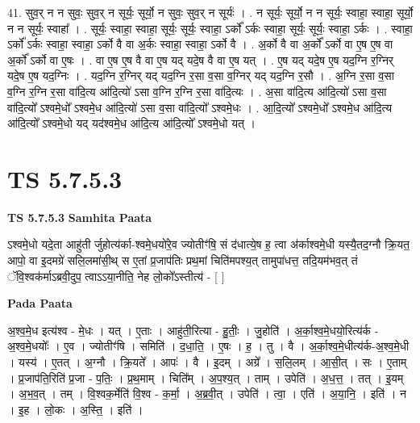 \documentclass[17pt]{extarticle}
\begin{document}
41. सुव॒र् न न सुवः॒ सुव॒र् न सूर्यः॒ सूर्यो॒ न सुवः॒ सुव॒र् न सूर्यः॑ । . न सूर्यः॒ सूर्यो॒ न न सूर्यः॒ स्वाहा॒ स्वाहा॒ सूर्यो॒ न न सूर्यः॒ स्वाहा᳚ । . सूर्यः॒ स्वाहा॒ स्वाहा॒ सूर्यः॒ सूर्यः॒ स्वाहा॒ ऽर्को᳚ ऽर्कः स्वाहा॒ सूर्यः॒ सूर्यः॒ स्वाहा॒ ऽर्कः । . स्वाहा॒ ऽर्को᳚ ऽर्कः स्वाहा॒ स्वाहा॒ ऽर्को वै वा अ॒र्कः स्वाहा॒ स्वाहा॒ ऽर्को वै । . अ॒र्को वै वा अ॒र्को᳚ ऽर्को वा ए॒ष ए॒ष वा अ॒र्को᳚ ऽर्को वा ए॒षः । . वा ए॒ष ए॒ष वै वा ए॒ष यद् यदे॒ष वै वा ए॒ष यत् । . ए॒ष यद् यदे॒ष ए॒ष यद॒ग्नि र॒ग्निर् यदे॒ष ए॒ष यद॒ग्निः । . यद॒ग्नि र॒ग्निर् यद् यद॒ग्नि र॒सा व॒सा व॒ग्निर् यद् यद॒ग्नि र॒सौ । . अ॒ग्नि र॒सा व॒सा व॒ग्नि र॒ग्नि र॒सा वा॑दि॒त्य आ॑दि॒त्यो॑ ऽसा व॒ग्नि र॒ग्नि र॒सा वा॑दि॒त्यः । . अ॒सा वा॑दि॒त्य आ॑दि॒त्यो॑ ऽसा व॒सा वा॑दि॒त्यो᳚ ऽश्वमे॒धो᳚ ऽश्वमे॒ध आ॑दि॒त्यो॑ ऽसा व॒सा वा॑दि॒त्यो᳚ ऽश्वमे॒धः । . आ॒दि॒त्यो᳚ ऽश्वमे॒धो᳚ ऽश्वमे॒ध आ॑दि॒त्य आ॑दि॒त्यो᳚ ऽश्वमे॒धो यद् यद॑श्वमे॒ध आ॑दि॒त्य आ॑दि॒त्यो᳚ ऽश्वमे॒धो यत् । \newline
\pagebreak
{}

\section{ TS 5.7.5.3 }

\textbf{TS 5.7.5.3 } \newline
\textbf{Samhita Paata} \newline

ऽश्वमे॒धो यदे॒ता आहु॑ती र्जुहोत्य॑र्का-श्वमे॒धयो॑रे॒व ज्योतीꣳ॑षि॒ सं द॑धात्ये॒ष ह॒ त्वा अ॑र्काश्वमे॒धी यस्यै॒तद॒ग्नौ क्रि॒यत॒ आपो॒ वा इ॒दमग्रे॑ सलि॒लमा॑सी॒थ् स ए॒तां प्र॒जाप॑तिः प्रथ॒मां चिति॑मपश्य॒त् तामुपा॑धत्त॒ तदि॒यम॑भव॒त् तं ॅवि॒श्वक॑र्माऽब्रवी॒दुप॒ त्वाऽऽया॒नीति॒ नेह लो॒को᳚ऽस्तीत्य॑ - [  ] \newline

\textbf{Pada Paata} \newline

अ॒श्व॒मे॒ध इत्य॑श्व - मे॒धः । यत् । ए॒ताः । आहु॑ती॒रित्या - हु॒तीः॒ । जु॒होति॑ । अ॒र्का॒श्व॒मे॒धयो॒रित्य॑र्क - अ॒श्व॒मे॒धयोः᳚ । ए॒व । ज्योतीꣳ॑षि । समिति॑ । द॒धा॒ति॒ । ए॒षः । ह॒ । तु । वै । अ॒र्का॒श्व॒मे॒धीत्य॑र्क-अ॒श्व॒मे॒धी । यस्य॑ । ए॒तत् । अ॒ग्नौ । क्रि॒यते᳚ । आपः॑ । वै । इ॒दम् । अग्रे᳚ । स॒लि॒लम् । आ॒सी॒त् । सः । ए॒ताम् । प्र॒जाप॑ति॒रिति॑ प्र॒जा - प॒तिः॒ । प्र॒थ॒माम् । चिति᳚म् । अ॒प॒श्य॒त् । ताम् । उपेति॑ । अ॒ध॒त्त॒ । तत् । इ॒यम् । अ॒भ॒व॒त् । तम् । वि॒श्वक॒र्मेति॑ वि॒श्व - क॒र्मा॒ । अ॒ब्र॒वी॒त् । उपेति॑ । त्वा॒ । एति॑ । अ॒या॒नि॒ । इति॑ । न । इ॒ह । लो॒कः । अ॒स्ति॒ । इति॑ ।  \newline
\end{document}
